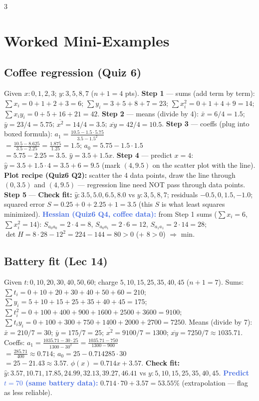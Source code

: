 \documentclass[9pt]{extarticle}
\newcommand{\wk}[1]{\textbf{\textcolor{OliveGreen}{#1}}}
\newcommand{\ex}[1]{\textbf{\textcolor{RoyalBlue}{#1}}}
\begin{document}
\begin{multicols}{3}
\section{Worked Mini-Examples}
\begin{sloppypar}\raggedright

\subsection{Coffee regression (Quiz 6)}
Given $x:0,1,2,3$; $y:3,5,8,7$ ($n{+}1{=}4$ pts).
\wk{Step 1} — sums (add term by term): $\sum x_i=0{+}1{+}2{+}3=6$; $\sum y_i=3{+}5{+}8{+}7=23$; $\sum x_i^2=0{+}1{+}4{+}9=14$; $\sum x_iy_i=0{+}5{+}16{+}21=42$.
\wk{Step 2} — means (divide by 4): $\bar x=6/4=1.5$; $\bar y=23/4=5.75$; $\overline{x^2}=14/4=3.5$; $\overline{xy}=42/4=10.5$.
\wk{Step 3} — coeffs (plug into boxed formula): $a_1=\tfrac{10.5-1.5\cdot5.75}{3.5-1.5^2}$\\
$=\tfrac{10.5-8.625}{3.5-2.25}=\tfrac{1.875}{1.25}=1.5$; $a_0=5.75-1.5\cdot1.5$\\
$=5.75-2.25=3.5$. $\boxed{\hat y=3.5+1.5x}$.
\wk{Step 4} — predict $x{=}4$: $\hat y=3.5+1.5\cdot4=3.5+6=9.5$ (mark $(4,9.5)$ on the scatter plot with the line).
\wk{Plot recipe (Quiz6 Q2):} scatter the 4 data points, draw the line through $(0,3.5)$ and $(4,9.5)$ — regression line need NOT pass through data points.
\wk{Step 5} — \wk{Check fit:} $\hat y:3.5,5.0,6.5,8.0$ vs $y:3,5,8,7$; residuals $-0.5,0,1.5,-1.0$; squared error $S=0.25+0+2.25+1=3.5$ (this $S$ is what least squares minimized).
\ex{Hessian (Quiz6 Q4, coffee data):} from Step 1 sums ($\sum x_i=6$, $\sum x_i^2=14$): $S_{a_0a_0}=2\cdot4=8$, $S_{a_0a_1}=2\cdot6=12$, $S_{a_1a_1}=2\cdot14=28$;\\
$\det H=8\cdot28-12^2=224-144=80>0$ (+ $8>0$) $\Rightarrow$ min.

\subsection{Battery fit (Lec 14)}
Given $t:0,10,20,30,40,50,60$; charge $5,10,15,25,35,40,45$ ($n{+}1{=}7$).
Sums: $\sum t_i=0{+}10{+}20{+}30{+}40{+}50{+}60=210$; $\sum y_i=5{+}10{+}15{+}25{+}35{+}40{+}45=175$; $\sum t_i^2=0{+}100{+}400{+}900{+}1600{+}2500{+}3600=9100$; $\sum t_iy_i=0{+}100{+}300{+}750{+}1400{+}2000{+}2700=7250$.
Means (divide by 7): $\bar x=210/7=30$; $\bar y=175/7=25$; $\overline{x^2}=9100/7=1300$; $\overline{xy}=7250/7\approx1035.71$.
Coeffs: $a_1=\tfrac{1035.71-30\cdot25}{1300-30^2}=\tfrac{1035.71-750}{1300-900}$\\
$=\tfrac{285.71}{400}\approx0.714$; $a_0=25-0.714285\cdot30$\\
$=25-21.43\approx3.57$. $\boxed{\phi(x)=0.714x+3.57}$.
\wk{Check fit:} $\hat y:3.57,10.71,17.85,24.99,32.13,39.27,46.41$ vs $y:5,10,15,25,35,40,45$.
\ex{Predict $t{=}70$ (same battery data):} $0.714\cdot70+3.57=53.55\%$ (extrapolation — flag as less reliable).


\end{sloppypar}
\end{multicols}
\end{document}
